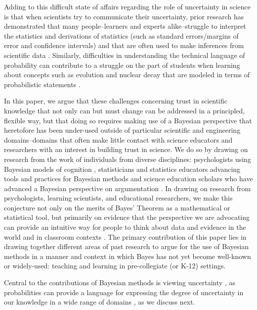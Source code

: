 \documentclass[man]{apa7}
\begin{document}
Adding to this difficult state of affairs regarding the role of uncertainty in science is that when scientists try to communicate their uncertainty, prior research has demonstrated that many people–learners and experts alike–struggle to interpret the statistics and derivations of statistics (such as standard errors/margins of error and confidence intervals) and that are often used to make inferences from scientific data \parencite{gkv04, s07, tk74}. Similarly, difficulties in understanding the technical language of probability can contribute to a struggle on the part of students when learning about concepts such as evolution and nuclear decay that are modeled in terms of probabilistic statements \parencite{fth17}.

In this paper, we argue that these challenges concerning trust in scientific knowledge that not only can but must change can be addressed in a principled, flexible way, but that doing so requires making use of a Bayesian perspective that heretofore has been under-used outside of particular scientific and engineering domains--domains that often make little contact with science educators and researchers with an interest in building trust in science. We do so by drawing on research from the work of individuals from diverse disciplines: psychologists using Bayesian models of cognition \parencite{g12, tgk06}, statisticians and statistics educators advancing tools and practices for Bayesian methods \parencite{a02, b02, h_a20, h_j20,me14, s07} and science education scholars who have advanced a Bayesian perspective on argumentation \parencite{n11, s07}. In drawing on research from psychologists, learning scientists, and educational researchers, we make this conjecture not only on the merits of Bayes' Theorem as a mathematical or statistical tool, but primarily on evidence that the perspective we are advocating can provide an intuitive way for people to think about data and evidence in the world \parencite{g12} and in classroom contexts \parencite{ll20, n11, s07, so12, w17}. The primary contribution of this paper lies in drawing together different areas of past research to argue for the use of Bayesian methods in a manner and context in which Bayes has not yet become well-known or widely-used: teaching and learning in pre-collegiate (or K-12) settings. 

Central to the contributions of Bayesian methods is viewing uncertainty , as probabilities can provide a language for expressing the degree of uncertainty in our knowledge in a wide range of domains \parencite{g12}, as we discuss next.
\end{document}
